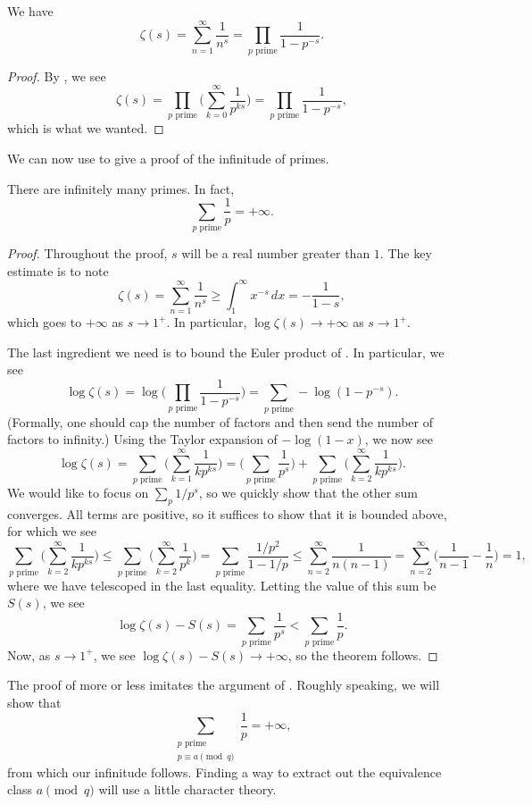 \documentclass[../notes.tex]{subfiles}
\begin{document}
\begin{corollary} \label{cor:euler-factor-zeta}
	We have
	\[\zeta(s)=\sum_{n=1}^\infty\frac1{n^s}=\prod_{p\text{ prime}}\frac1{1-p^{-s}}.\]
\end{corollary}
\begin{proof}
	By , we see
	\[\zeta(s)=\prod_{p\text{ prime}}\Bigg(\sum_{k=0}^\infty\frac1{p^{ks}}\Bigg)=\prod_{p\text{ prime}}\frac1{1-p^{-s}},\]
	which is what we wanted.
\end{proof}
We can now use  to give a proof of the infinitude of primes.
\begin{theorem} \label{thm:inf-primes}
	There are infinitely many primes. In fact,
	\[\sum_{p\text{ prime}}\frac1p=+\infty.\]
\end{theorem}
\begin{proof}
	Throughout the proof, $s$ will be a real number greater than $1$. The key estimate is to note
	\[\zeta(s)=\sum_{n=1}^\infty\frac1{n^s}\ge\int_1^\infty x^{-s}\,dx=-\frac1{1-s},\]
	which goes to $+\infty$ as $s\to1^+$. In particular, $\log\zeta(s)\to+\infty$ as $s\to1^+$.

	The last ingredient we need is to bound the Euler product of . In particular, we see
	\[\log\zeta(s)=\log\Bigg(\prod_{p\text{ prime}}\frac1{1-p^{-s}}\Bigg)=\sum_{p\text{ prime}}-\log\left(1-p^{-s}\right).\]
	(Formally, one should cap the number of factors and then send the number of factors to infinity.) Using the Taylor expansion of $-\log(1-x)$, we now see
	\[\log\zeta(s)=\sum_{p\text{ prime}}\Bigg(\sum_{k=1}^\infty\frac1{kp^{ks}}\Bigg)=\Bigg(\sum_{p\text{ prime}}\frac1{p^s}\Bigg)+\sum_{p\text{ prime}}\Bigg(\sum_{k=2}^\infty\frac1{kp^{ks}}\Bigg).\]
	We would like to focus on $\sum_p1/p^s$, so we quickly show that the other sum converges. All terms are positive, so it suffices to show that it is bounded above, for which we see
	\[\sum_{p\text{ prime}}\Bigg(\sum_{k=2}^\infty\frac1{kp^{ks}}\Bigg)\le\sum_{p\text{ prime}}\Bigg(\sum_{k=2}^\infty\frac1{p^k}\Bigg)=\sum_{p\text{ prime}}\frac{1/p^2}{1-1/p}\le\sum_{n=2}^\infty\frac1{n(n-1)}=\sum_{n=2}^\infty\Bigg(\frac1{n-1}-\frac1n\Bigg)=1,\]
	where we have telescoped in the last equality. Letting the value of this sum be $S(s)$, we see
	\[\log\zeta(s)-S(s)=\sum_{p\text{ prime}}\frac1{p^s}<\sum_{p\text{ prime}}\frac1p.\]
	Now, as $s\to1^+$, we see $\log\zeta(s)-S(s)\to+\infty$, so the theorem follows.
\end{proof}
The proof of  more or less imitates the argument of . Roughly speaking, we will show that
\[\sum_{\substack{p\text{ prime}\\p\equiv a\pmod q}}\frac1p=+\infty,\]
from which our infinitude follows. Finding a way to extract out the equivalence class $a\pmod q$ will use a little character theory.
\end{document}
